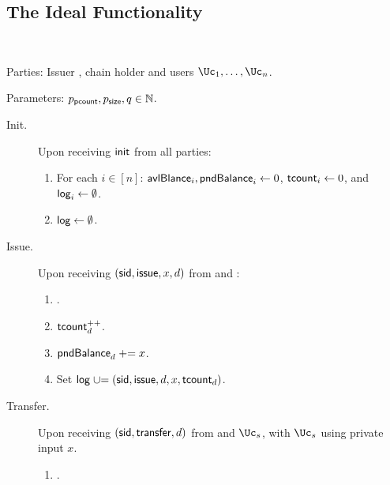 \subsection{The Ideal Functionality}\label{sec:MainProtocol:Ideal}


\begin{functionality}\label{func:ConfidentialTransactions}~
	
	
	
	\item[Parties:]	Issuer \Ic, chain holder  \Cc and users  $\Uc_1, 
	\ldots,\Uc_n$.
	
	
	\item[Parameters:] $p_{\mathsf{pcount}},p_{\mathsf{size}},q \in {\mathbb{N}}$.
	
	
	\begin{description}
		\item[Init.] Upon receiving $\mathsf{init}$ from  all parties: 
		\begin{enumerate}
			\item  For each $i\in [n]$:  $\mathsf{avlBlance}_i,\mathsf{pndBalance}_i \leftarrow 0$, $\mathsf{tcount}_i \leftarrow 0$, and  $\mathsf{log}_i \leftarrow \emptyset$.
			
			\item  $\mathsf{log} \leftarrow \emptyset$.
		\end{enumerate}
		
			\item[Issue.]   Upon receiving $(\mathsf{sid},\mathsf{issue},x,d)$ from  \Cc and \Ic:
		\begin{enumerate}
			
			
			\item {}.
			
			\item $\mathsf{tcount}_d^{++}$.
			
			\item $\mathsf{pndBalance}_d \mathrel{+}= x$.
			
			\item Set $\mathsf{log} \mathrel{\cup}= {(\mathsf{sid},\mathsf{issue},d,x,\mathsf{tcount}_d)}$.
		\end{enumerate}
		
		
		\item[Transfer.]    Upon receiving  $(\mathsf{sid},\mathsf{transfer},d)$ from  \Cc and  $\Uc_s$, with  $\Uc_s$ using private input $x$. 
		
	
		\begin{enumerate}
			\item {}.
			

\end{enumerate}
\end{description}
\end{functionality}
